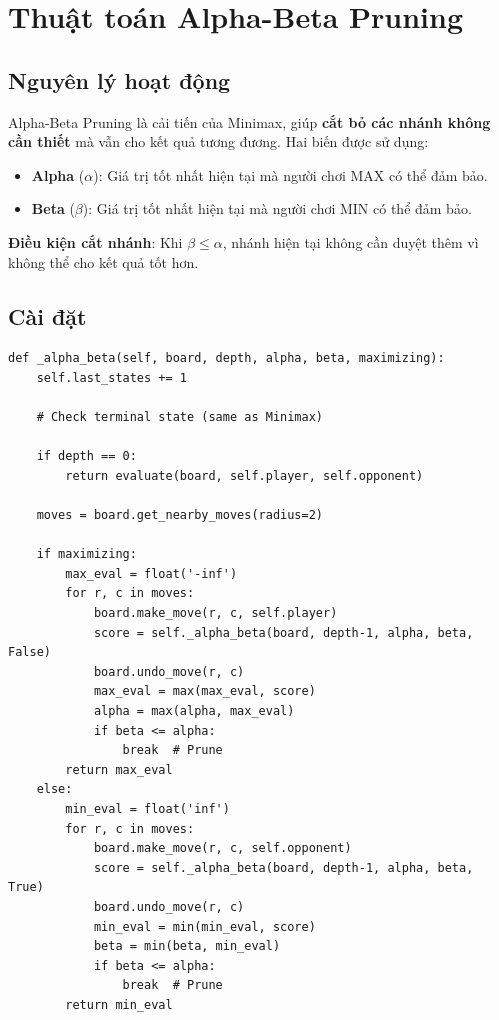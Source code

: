 \documentclass[12pt,a4paper]{article}
\begin{document}
\section{Thuật toán Alpha-Beta Pruning}

\subsection{Nguyên lý hoạt động}

Alpha-Beta Pruning là cải tiến của Minimax, giúp \textbf{cắt bỏ các nhánh không cần thiết} mà vẫn cho kết quả tương đương. Hai biến được sử dụng:

\begin{itemize}
    \item \textbf{Alpha} ($\alpha$): Giá trị tốt nhất hiện tại mà người chơi MAX có thể đảm bảo.
    \item \textbf{Beta} ($\beta$): Giá trị tốt nhất hiện tại mà người chơi MIN có thể đảm bảo.
\end{itemize}

\textbf{Điều kiện cắt nhánh}: Khi $\beta \leq \alpha$, nhánh hiện tại không cần duyệt thêm vì không thể cho kết quả tốt hơn.

\subsection{Cài đặt}

\begin{lstlisting}[style=python]
def _alpha_beta(self, board, depth, alpha, beta, maximizing):
    self.last_states += 1
    
    # Check terminal state (same as Minimax)
    
    if depth == 0:
        return evaluate(board, self.player, self.opponent)
    
    moves = board.get_nearby_moves(radius=2)
    
    if maximizing:
        max_eval = float('-inf')
        for r, c in moves:
            board.make_move(r, c, self.player)
            score = self._alpha_beta(board, depth-1, alpha, beta, False)
            board.undo_move(r, c)
            max_eval = max(max_eval, score)
            alpha = max(alpha, max_eval)
            if beta <= alpha:
                break  # Prune
        return max_eval
    else:
        min_eval = float('inf')
        for r, c in moves:
            board.make_move(r, c, self.opponent)
            score = self._alpha_beta(board, depth-1, alpha, beta, True)
            board.undo_move(r, c)
            min_eval = min(min_eval, score)
            beta = min(beta, min_eval)
            if beta <= alpha:
                break  # Prune
        return min_eval
\end{lstlisting}
\end{document}
